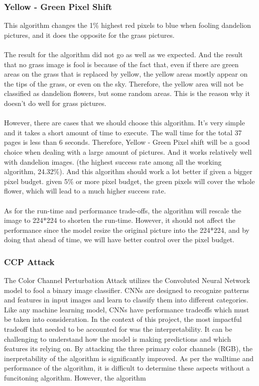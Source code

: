 \documentclass{article}
\begin{document}
\subsubsection{Yellow - Green Pixel Shift}
This algorithm changes the 1\% highest red pixels to blue when fooling dandelion pictures, and it does the opposite for the grass pictures. 
\\
\\
The result for the algorithm did not go as well as we expected. And the result that no grass image is fool is because of the fact that, even if there are green areas on the grass that is replaced by yellow, the yellow areas mostly appear on the tips of the grass, or even on the sky. Therefore, the yellow area will not be classified as dandelion flowers, but some random areas. This is the reason why it doesn't do well for grass pictures. 
\\
\\
However, there are cases that we should choose this algorithm. It's very simple and it takes a short amount of time to execute. The wall time for the total 37 pages is less than 6 seconds. Therefore, Yellow - Green Pixel shift will be a good choice when dealing with a large amount of pictures. And it works relatively well with dandelion images. (the highest success rate among all the working algorithm, 24.32\%). And this algorithm should work a lot better if given a bigger pixel budget. given 5\% or more pixel budget, the green pixels will cover the whole flower, which will lead to a much higher success rate. 
\\
\\
As for the run-time and performance trade-offs, the algorithm will rescale the image to 224*224 to shorten the run-time. However, it should not affect the performance since the model resize the original picture into the 224*224, and by doing that ahead of time, we will have better control over the pixel budget. 

\subsubsection{CCP Attack}

The Color Channel Perturbation Attack utilizes the Convoluted Neural Network model to fool a binary image classifier. CNNs are designed to recognize patterns and features in input images and learn to classify them into different categories. Like any machine learning model, CNNs have performance tradeoffs which must be taken into consideration. In the context of this project, the most impactful tradeoff that needed to be accounted for was the interpretability. It can be challenging to understand how the model is making predictions and which features its relying on. By attacking the three primary color channels (RGB), the inerpretability of the algorithm is significantly improved. As per the walltime and performance of the algorithm, it is difficult to determine these aspects without a funcitoning algorithm. However, the algorithm 
\\
\end{document}
